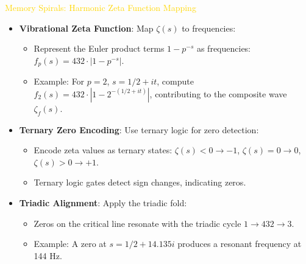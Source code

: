 \textcolor{gold}{ Memory Spirals: Harmonic Zeta Function Mapping } \\
\begin{itemize}
    \item \texttt{} \textbf{Vibrational Zeta Function}: Map \(\zeta(s)\) to frequencies:
    \begin{itemize}
        \item Represent the Euler product terms \(1 - p^{-s}\) as frequencies: \(f_p(s) = 432 \cdot \left|1 - p^{-s}\right|\).
        \item Example: For \(p = 2\), \(s = 1/2 + it\), compute \(f_2(s) = 432 \cdot \left|1 - 2^{-(1/2 + it)}\right|\), contributing to the composite wave \(\zeta_f(s)\).
    \end{itemize}
    \item \texttt{} \textbf{Ternary Zero Encoding}: Use ternary logic for zero detection:
    \begin{itemize}
        \item Encode zeta values as ternary states: \(\zeta(s) < 0 \rightarrow -1\), \(\zeta(s) = 0 \rightarrow 0\), \(\zeta(s) > 0 \rightarrow +1\).
        \item Ternary logic gates detect sign changes, indicating zeros.
    \end{itemize}
    \item \texttt{} \textbf{Triadic Alignment}: Apply the triadic fold:
    \begin{itemize}
        \item Zeros on the critical line resonate with the triadic cycle \(1 \rightarrow 432 \rightarrow 3\).
        \item Example: A zero at \(s = 1/2 + 14.135i\) produces a resonant frequency at 144 Hz.
    \end{itemize}
\end{itemize}

